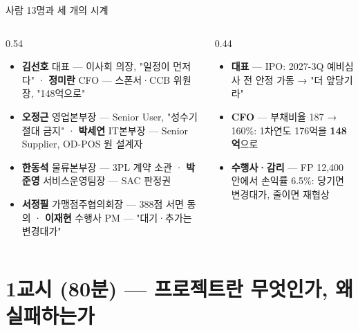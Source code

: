 \begin{frame}{사람 13명과 세 개의 시계}
\begin{columns}[T]
\begin{column}{0.54\textwidth}
\begin{itemize}\small
\item \textbf{김선호} 대표 — 이사회 의장, "일정이 먼저다" · \textbf{정미란} CFO — 스폰서·CCB 위원장, "148억으로"
\item \textbf{오정근} 영업본부장 — Senior User, "성수기 절대 금지" · \textbf{박세연} IT본부장 — Senior Supplier, OD-POS 원 설계자
\item \textbf{한동석} 물류본부장 — 3PL 계약 소관 · \textbf{박준영} 서비스운영팀장 — SAC 판정권
\item \textbf{서정필} 가맹점주협의회장 — 388점 서면 동의 · \textbf{이재현} 수행사 PM — "대기·추가는 변경대가"
\end{itemize}
\end{column}
\begin{column}{0.44\textwidth}
\begin{itemize}\small
\item \textbf{대표} — IPO: 2027-3Q 예비심사 전 안정 가동 → "더 앞당기라"
\item \textbf{CFO} — 부채비율 187 → 160\%: 1차연도 176억을 \textbf{148억}으로
\item \textbf{수행사·감리} — FP 12,400 안에서 손익률 6.5\%: 당기면 변경대가, 줄이면 재협상
\end{itemize}
\end{column}
\end{columns}
\end{frame}

\section{1교시 (80분) — 프로젝트란 무엇인가, 왜 실패하는가}

